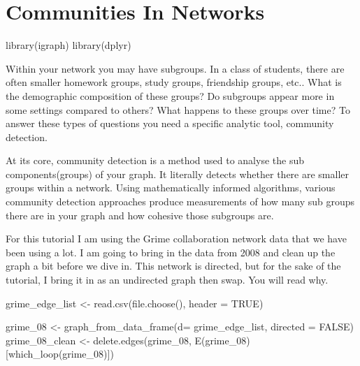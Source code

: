 \documentclass[
  letterpaper,
  DIV=11,
  numbers=noendperiod]{scrreprt}
\newenvironment{Shaded}{\begin{snugshade}}{\end{snugshade}}
\newcommand{\AttributeTok}[1]{\textcolor[rgb]{0.40,0.45,0.13}{#1}}
\newcommand{\ConstantTok}[1]{\textcolor[rgb]{0.56,0.35,0.01}{#1}}
\newcommand{\FunctionTok}[1]{\textcolor[rgb]{0.28,0.35,0.67}{#1}}
\newcommand{\NormalTok}[1]{\textcolor[rgb]{0.00,0.23,0.31}{#1}}
\newcommand{\OtherTok}[1]{\textcolor[rgb]{0.00,0.23,0.31}{#1}}
\begin{document}
\chapter{Communities In Networks}\label{communities-in-networks}

\begin{Shaded}
\begin{Highlighting}[]
\FunctionTok{library}\NormalTok{(igraph)}
\FunctionTok{library}\NormalTok{(dplyr)}
\end{Highlighting}
\end{Shaded}

Within your network you may have subgroups. In a class of students,
there are often smaller homework groups, study groups, friendship
groups, etc.. What is the demographic composition of these groups? Do
subgroups appear more in some settings compared to others? What happens
to these groups over time? To answer these types of questions you need a
specific analytic tool, community detection.

At its core, community detection is a method used to analyse the sub
components(groups) of your graph. It literally detects whether there are
smaller groups within a network. Using mathematically informed
algorithms, various community detection approaches produce measurements
of how many sub groups there are in your graph and how cohesive those
subgroups are.

For this tutorial I am using the Grime collaboration network data that
we have been using a lot. I am going to bring in the data from 2008 and
clean up the graph a bit before we dive in. This network is directed,
but for the sake of the tutorial, I bring it in as an undirected graph
then swap. You will read why.

\begin{Shaded}
\begin{Highlighting}[]
\NormalTok{grime\_edge\_list }\OtherTok{\textless{}{-}} \FunctionTok{read.csv}\NormalTok{(}\FunctionTok{file.choose}\NormalTok{(), }\AttributeTok{header =} \ConstantTok{TRUE}\NormalTok{)}

\NormalTok{grime\_08 }\OtherTok{\textless{}{-}} \FunctionTok{graph\_from\_data\_frame}\NormalTok{(}\AttributeTok{d=}\NormalTok{ grime\_edge\_list, }\AttributeTok{directed =} \ConstantTok{FALSE}\NormalTok{)}
\NormalTok{grime\_08\_clean }\OtherTok{\textless{}{-}} \FunctionTok{delete.edges}\NormalTok{(grime\_08, }\FunctionTok{E}\NormalTok{(grime\_08)[}\FunctionTok{which\_loop}\NormalTok{(grime\_08)])}
\end{Highlighting}
\end{Shaded}
\end{document}
